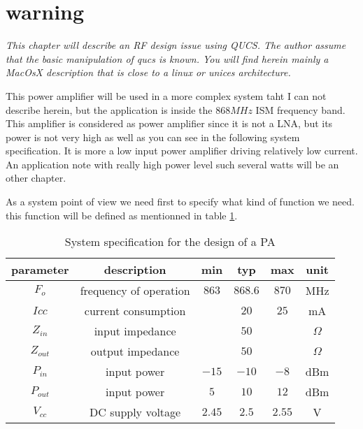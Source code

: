 %
%
%
%

\section*{warning}

\textit{
This chapter will describe an RF design issue using QUCS. The author assume that the basic manipulation of qucs is known. You will find herein mainly a MacOsX description that is close to a linux or unices architecture.
}


This power amplifier will be used in a more complex system taht I can not describe herein, but the application is inside the $868MHz$ ISM frequency band. This amplifier is considered as power amplifier since it is not a LNA, but its power is not very high as well as you can see in the following system specification. It is more a low input power amplifier driving relatively low current. An application note with really high power level such several watts will be an other chapter.



As a system point of view we need first to specify what kind of function we need. this function will be defined as mentionned in table \ref{design:pa:systemSpecification}.


\begin{table}[htdp]
\caption{System specification for the design of a PA}
\begin{center}
\begin{tabular}{|c|c|c|c|c|c|} \hline
parameter & description 					& min   & typ     & max   & unit \\ \hline \hline
$F_o$     & frequency of operation		& $863$ & $868.6$ & $870$ & MHz \\
$Icc$ 	   & current consumption        &       & $20$    & $25$    & mA \\ \hline
$Z_{in}$  & input impedance            &       & $50$    &        & $\Omega$ \\
$Z_{out}$  & output impedance            &       & $50$    &        & $\Omega$ \\ \hline
$P_{in}$   & input power                &   $-15$ & $-10$ & $-8$ & dBm \\
$P_{out}$   & input power                &   $5$ & $10$ & $12$ & dBm \\ \hline
$V_{cc}$   & DC supply voltage                &   $2.45$ & $2.5$ & $2.55$ & V \\ \hline
\end{tabular}
\end{center}
\label{design:pa:systemSpecification}
\end{table}

